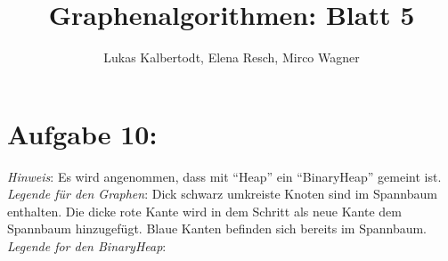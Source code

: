 \documentclass[11pt]{scrartcl} %
\title{Graphenalgorithmen: Blatt 5}
\author{Lukas Kalbertodt, Elena Resch, Mirco Wagner}
\begin{document}
\maketitle


\section*{Aufgabe 10:}
\emph{Hinweis}: Es wird angenommen, dass mit \enquote{Heap} ein \enquote{BinaryHeap} gemeint ist.\\[0.2cm]
\emph{Legende für den Graphen}: Dick schwarz umkreiste Knoten sind im Spannbaum enthalten. Die dicke rote Kante wird in dem Schritt als neue Kante dem Spannbaum hinzugefügt. Blaue Kanten befinden sich bereits im Spannbaum.\\[0.2cm]
\emph{Legende for den BinaryHeap}:

\newcommand{\stepsep}{\\ \multicolumn{2}{c}{\textcolor{lightgray}{\rule{3.5cm}{0.4pt}}} \\}
\end{document}
